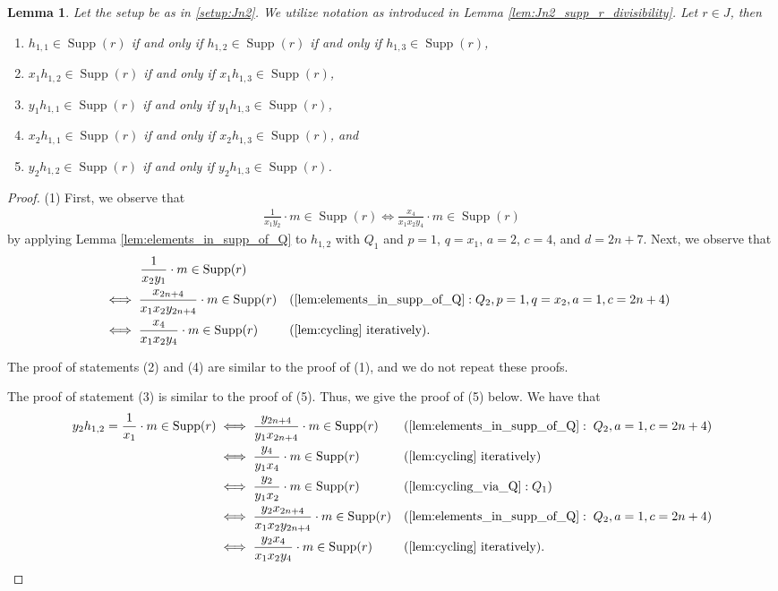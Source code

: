 \documentclass[12pt,a4paper]{amsart}
\theoremstyle{plain}
\newtheorem{lem}[thrm]{Lemma}
\def\blem{\begin{lem}}
\def\elem{\end{lem}}
\theoremstyle{definition}
\def\bproof{\begin{proof}}
\def\eproof{\end{proof}}
\theoremstyle{remark}
\DeclareMathOperator{\Supp}{Supp}
\begin{document}
\blem
\label{lem:Jn2_three_elts_in_supp_r}
Let the setup be as in \ref{setup:Jn2}. We utilize notation as introduced in Lemma \ref{lem:Jn2_supp_r_divisibility}. Let $r \in J$, then 
\begin{enumerate}
    \item $h_{1,1} \in \Supp(r)$ if and only if $h_{1,2} \in \Supp(r)$ if and only if $h_{1,3} \in \Supp(r)$,
    \item $x_{1} h_{1,2} \in \Supp(r)$ if and only if $x_{1} h_{1,3} \in \Supp(r)$,
    \item $y_{1} h_{1,1} \in \Supp(r)$ if and only if $y_{1} h_{1,3} \in \Supp(r)$,
    \item $x_{2} h_{1,1} \in \Supp(r)$ if and only if $x_{2} h_{1,3} \in \Supp(r)$, and
    \item $y_{2} h_{1,2} \in \Supp(r)$ if and only if $y_{2} h_{1,3} \in \Supp(r)$.
\end{enumerate}
\elem 

\bproof
(1) First, we observe that 
\begin{align*}
    \frac{1}{x_{1}y_{2}}\cdot m \in \Supp(r) \iff \frac{x_{4}}{x_{1}x_{2}y_{4}}\cdot m \in \Supp(r)
\end{align*}
by applying Lemma \ref{lem:elements_in_supp_of_Q} to $h_{1,2}$ with $Q_{1}$ and $p = 1$, $q = x_{1}$, $a = 2$, $c = 4$, and $d = 2n+7$.
Next, we observe that 
\begin{align*}
    &\phantom{\iff\,\,\,\,} \frac{1}{x_{2}y_{1}}\cdot m \in \Supp(r) \\
    &\iff \frac{x_{2n+4}}{x_{1}x_{2}y_{2n+4}} \cdot m \in \Supp(r) & & (\ref{lem:elements_in_supp_of_Q} : Q_{2}, p = 1, q = x_{2}, a = 1, c = 2n+4) \\
    &\iff \frac{x_{4}}{x_{1}x_{2}y_{4}} \cdot m \in \Supp(r) & & (\ref{lem:cycling} \text{ iteratively}).
\end{align*}

The proof of statements (2) and (4) are similar to the proof of (1), and we do not repeat these proofs.

The proof of statement (3) is similar to the proof of (5). Thus, we give the proof of (5) below. We have that
\begin{align*}
    y_{2}h_{1,2} = \frac{1}{x_{1}}\cdot m \in \Supp(r)
    &\iff \frac{y_{2n+4}}{y_{1}x_{2n+4}}\cdot m \in \Supp(r) & & (\ref{lem:elements_in_supp_of_Q}:\; Q_{2}, a=1,c= 2n+4) \\
    &\iff \frac{y_{4}}{y_{1}x_{4}}\cdot m \in \Supp(r) & & (\ref{lem:cycling} \text{ iteratively}) \\
    &\iff \frac{y_{2}}{y_{1}x_{2}}\cdot m \in \Supp(r) & &(\ref{lem:cycling_via_Q} : Q_{1}) \\
    &\iff \frac{y_{2}x_{2n+4}}{x_{1}x_{2}y_{2n+4}}\cdot m \in \Supp(r) & & (\ref{lem:elements_in_supp_of_Q}:\; Q_{2}, a=1, c = 2n+4) \\
    &\iff \frac{y_{2}x_{4}}{x_{1}x_{2}y_{4}}\cdot m \in \Supp(r) & & (\ref{lem:cycling} \text{ iteratively}).
\end{align*}
\eproof
\end{document}
